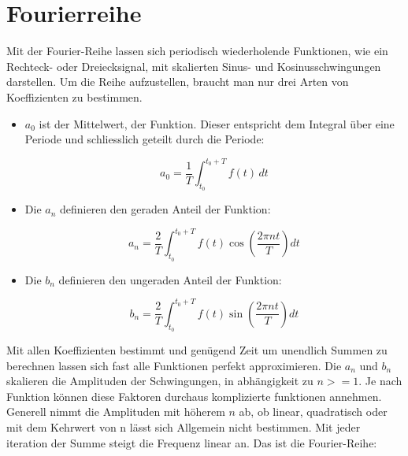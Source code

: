 %
%
%
%

\section{Fourierreihe\label{fourier:section:GrundlagenFourierAnalyse}}


Mit der Fourier-Reihe lassen sich periodisch wiederholende Funktionen, wie ein Rechteck- oder Dreiecksignal, mit skalierten Sinus- und Kosinusschwingungen darstellen. 
Um die Reihe aufzustellen, braucht man nur drei Arten von Koeffizienten zu bestimmen. 

\begin{itemize}
	\item $a_0$ ist der Mittelwert, der Funktion. 
	Dieser entspricht dem Integral über eine Periode und schliesslich geteilt durch die Periode: 
	
	\begin{equation}
		a_0 = \frac{1}{T} \int_{t_0}^{t_0 + T} f(t) \, dt
	\end{equation}
	
	\item Die $a_n$ definieren den geraden Anteil der Funktion:
	
	\begin{equation}
		a_n = \frac{2}{T} \int_{t_0}^{t_0 + T} f(t) \cos\left(\frac{2\pi n t}{T}\right) dt
	\end{equation}
	
	\item Die $b_n$ definieren den ungeraden Anteil der Funktion:
	
	\begin{equation}
		b_n = \frac{2}{T} \int_{t_0}^{t_0 + T} f(t) \sin\left(\frac{2\pi n t}{T}\right) dt
	\end{equation}
	
\end{itemize}


Mit allen Koeffizienten bestimmt und genügend Zeit um unendlich Summen zu berechnen lassen sich fast alle Funktionen perfekt approximieren.
Die $a_n$ und $b_n$ skalieren die Amplituden der Schwingungen, in abhängigkeit zu $n>=1$. 
Je nach Funktion können diese Faktoren durchaus komplizierte funktionen annehmen.
Generell nimmt die Amplituden mit höherem $n$ ab, ob linear, quadratisch oder mit dem Kehrwert von n lässt sich Allgemein nicht bestimmen.
Mit jeder iteration der Summe steigt die Frequenz linear an.
Das ist die Fourier-Reihe:


